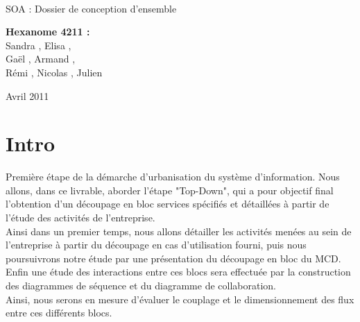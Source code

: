\documentclass[a4paper]{article}
\begin{document}
\begin{titlepage}
~ 
\vfill
	\begin{center}
		\begin{Huge}
		SOA : Dossier de conception d'ensemble\\
		\end{Huge} 
\vfill
		\textbf{Hexanome 4211 :} 
		\\Sandra {}, Elisa , 
		\\Gaël , Armand , 
		\\Rémi , Nicolas , Julien \\

\vfill		
		\begin{Large}
		Avril 2011
		\end{Large}
\vfill

	\end{center}
\vfill
\end{titlepage}

\newpage
\tableofcontents
\newpage

\section*{Intro}

Première étape de la démarche d'urbanisation du système d'information. Nous allons, dans ce livrable, aborder l'étape "Top-Down", qui a pour objectif final l'obtention d'un découpage en bloc services spécifiés et détaillées à partir de l'étude des activités de l'entreprise.\\
Ainsi dans un premier temps, nous allons détailler les activités menées au sein de l'entreprise à partir du découpage en cas d'utilisation fourni, puis nous poursuivrons notre étude par une présentation du découpage en bloc du MCD. Enfin une étude des interactions entre ces blocs sera effectuée par la construction des diagrammes de séquence et du diagramme de collaboration.\\
Ainsi, nous serons en mesure d'évaluer le couplage et le dimensionnement des flux entre ces différents blocs.





\end{document}
